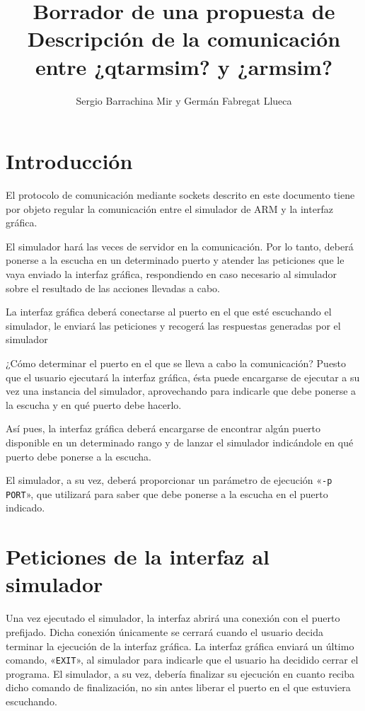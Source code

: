 \documentclass[notitlepage,11pt,a4paper,final,twoside]{article}
\title{Borrador de una propuesta de \\
  Descripción de la comunicación entre ¿qtarmsim? y ¿armsim?}
\author{Sergio Barrachina Mir y Germán Fabregat Llueca}
\begin{document}
\maketitle{}

\tableofcontents

\section{Introducción}

El protocolo de comunicación mediante sockets descrito en este
documento tiene por objeto regular la comunicación entre el simulador
de ARM y la interfaz gráfica.

El simulador hará las veces de servidor en la comunicación. Por lo
tanto, deberá ponerse a la escucha en un determinado puerto y atender
las peticiones que le vaya enviado la interfaz gráfica, respondiendo
en caso necesario al simulador sobre el resultado de las acciones
llevadas a cabo.

La interfaz gráfica deberá conectarse al puerto en el que esté
escuchando el simulador, le enviará las peticiones y recogerá las
respuestas generadas por el simulador

¿Cómo determinar el puerto en el que se lleva a cabo la comunicación?
Puesto que el usuario ejecutará la interfaz gráfica, ésta puede
encargarse de ejecutar a su vez una instancia del simulador,
aprovechando para indicarle que debe ponerse a la escucha y en qué
puerto debe hacerlo.

Así pues, la interfaz gráfica deberá encargarse de encontrar algún
puerto disponible en un determinado rango y de lanzar el simulador
indicándole en qué puerto debe ponerse a la escucha.

El simulador, a su vez, deberá proporcionar un parámetro de ejecución
«\verb+-p PORT+», que utilizará para saber que debe ponerse a la
escucha en el puerto indicado.


\section{Peticiones de la interfaz al simulador}

Una vez ejecutado el simulador, la interfaz abrirá una conexión con el
puerto prefijado. Dicha conexión únicamente se cerrará cuando el
usuario decida terminar la ejecución de la interfaz gráfica. La
interfaz gráfica enviará un último comando, «\texttt{EXIT}», al
simulador para indicarle que el usuario ha decidido cerrar el
programa. El simulador, a su vez, debería finalizar su ejecución en
cuanto reciba dicho comando de finalización, no sin antes liberar el
puerto en el que estuviera escuchando.
\end{document}
